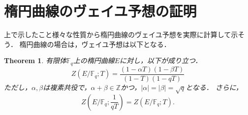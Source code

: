 \documentclass{ujarticle}
\newtheorem{thm}{Theorem}[section]
\begin{document}
\section{楕円曲線のヴェイユ予想の証明}
\label{sec:楕円曲線のヴェイユ予想の証明}
上で示したこと様々な性質から楕円曲線のヴェイユ予想を実際に計算して示そう．
楕円曲線の場合は，ヴェイユ予想は以下となる．
\begin{thm}
 有限体$\mathbb{F}_q$上の楕円曲線$E$に対し，以下が成り立つ．
  \begin{equation*}
   Z(E/\mathbb{F}_q;T)=\frac{(1- \alpha T)(1- \beta T)}{(1-T)(1-qT)}
  \end{equation*}
  ただし，$\alpha,\beta$は複素共役で，$\alpha+\beta \in \mathbb{Z}$かつ，$|\alpha|=|\beta|= \sqrt{q}$となる．
  さらに，
  \begin{equation*}
   Z(E/\mathbb{F}_q; \frac{1}{qT})=Z(E/\mathbb{F}_q;T).
  \end{equation*}
\end{thm}
\end{document}
